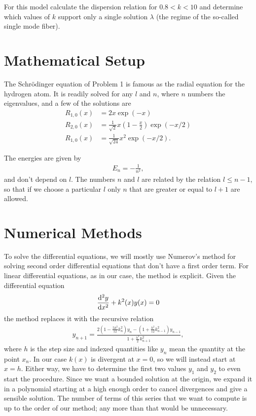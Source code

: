 \documentclass[10pt,a4paper,twocolumn]{article}
\begin{document}
For this model calculate the dispersion relation for $0.8 < k < 10$ and determine which values of $k$ support only a single solution $\lambda$ (the regime of the so-called single mode fiber).


\section{Mathematical Setup}

The Schr\"odinger equation of Problem 1 is famous as the radial equation for the hydrogen atom. It is readily solved for any $l$ and $n$, where $n$ numbers the eigenvalues, and a few of the solutions are
%
\begin{align}
    R_{1,0}(x) &= 2 x \exp(-x)\\
    R_{2,0}(x) &= \frac{1}{\sqrt{2}} x \left(1 - \frac{x}{2} \right) \exp(-x/2)\\
    R_{1,0}(x) &= \frac{1}{\sqrt{24}} x^2 \exp(-x/2).
\end{align}

The energies are given by
%
\begin{align}\label{eq:ergs}
    E_{n} = - \frac{1}{n^2},
\end{align}
%
and don't depend on $l$. The numbers $n$ and $l$ are related by the relation $l \leq n - 1$, so that if we choose a particular $l$ only $n$ that are greater or equal to $l + 1$ are allowed.

\section{Numerical Methods}

To solve the differential equations, we will mostly use Numerov's method \cite{numerov} for solving second order differential equations that don't have a first order term. For linear differential equations, as in our case, the method is explicit. Given the differential equation
%
\begin{align}
    \frac{\mathrm{d^2} y}{\dif x^2} + k^2(x) y(x) = 0
\end{align}
%
the method replaces it with the recursive relation
%
\begin{align}
    y_{n+1} = \frac{2 \left( 1 - \frac{5h^2}{12} k_{n}^2 \right) y_{n} - \left( 1 + \frac{h^2}{12} k_{n - 1}^2 \right) y_{n - 1}}{1 + \frac{h^2}{2} k_{n+1}^2},
\end{align}
%
where $h$ is the step size and indexed quantities like $y_n$ mean the quantity at the point $x_n$. In our case $k(x)$ is divergent at $x=0$, so we will instead start at $x=h$. Either way, we have to determine the first two values $y_1$ and $y_2$ to even start the procedure. Since we want a bounded solution at the origin, we expand it in a polynomial starting at a high enough order to cancel divergences and give a sensible solution. The number of terms of this series that we want to compute is up to the order of our method; any more than that would be unnecessary.
\end{document}
